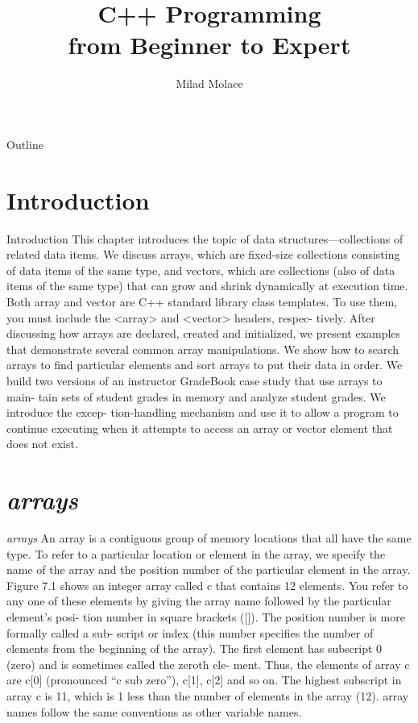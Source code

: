 \documentclass[10pt]{beamer}
\author[miladmolaee@hotmail.com]{\large Milad Molaee}
\title[C++ Programming]{C++ Programming\\\vspace{5pt}from Beginner to Expert\\\vspace{20pt}{\color{darkblue}\large Chapter 7: Class Templates array and vector\\and Catching Exceptions}}
\begin{document}
 
%
\frame{\titlepage}

%
\begin{frame}{Outline}
\tableofcontents
\end{frame}


\section{Introduction}
\begin{frame}{Introduction}
	This chapter introduces the topic of data structures—collections of related data items. We
	discuss arrays, which are fixed-size collections consisting of data items of the same type,
	and vectors, which are collections (also of data items of the same type) that can grow and
	shrink dynamically at execution time. Both array and vector are C++ standard library
	class templates. To use them, you must include the <array> and <vector> headers, respec-
	tively.
	After discussing how arrays are declared, created and initialized, we present examples
	that demonstrate several common array manipulations. We show how to search arrays to
	find particular elements and sort arrays to put their data in order.
	We build two versions of an instructor GradeBook case study that use arrays to main-
	tain sets of student grades in memory and analyze student grades. We introduce the excep-
	tion-handling mechanism and use it to allow a program to continue executing when it
	attempts to access an array or vector element that does not exist.
\end{frame}

\section{\texorpdfstring{\color{lblue}\textbf{\textit{arrays}}}{arrays}}
\begin{frame}{\textit{\color{blue}arrays}}
	An array is a contiguous group of memory locations that all have the same type. To refer
	to a particular location or element in the array, we specify the name of the array and the
	position number of the particular element in the array.
	Figure 7.1 shows an integer array called c that contains 12 elements. You refer to any
	one of these elements by giving the array name followed by the particular element’s posi-
	tion number in square brackets ([]). The position number is more formally called a sub-
	script or index (this number specifies the number of elements from the beginning of the
	array). The first element has subscript 0 (zero) and is sometimes called the zeroth ele-
	ment. Thus, the elements of array c are c[0] (pronounced “c sub zero”), c[1], c[2] and
	so on. The highest subscript in array c is 11, which is 1 less than the number of elements
	in the array (12). array names follow the same conventions as other variable names.
\end{frame}
	
\end{document}
